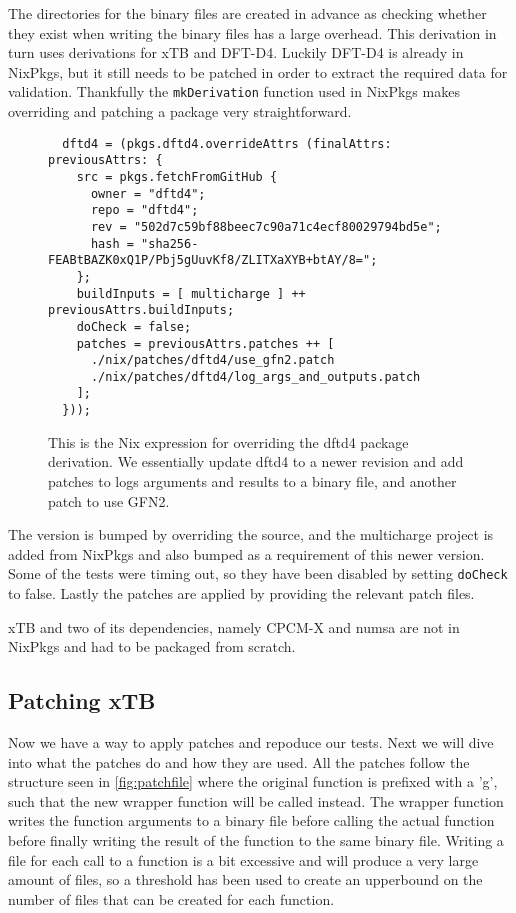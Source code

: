 The directories for the binary files are created in advance as checking whether they exist when writing the binary files has a large overhead.
This derivation in turn uses derivations for xTB and DFT-D4. Luckily DFT-D4 is already in NixPkgs, but it still needs to be patched in order to extract the required data for validation. Thankfully the \verb|mkDerivation| function used in NixPkgs makes overriding and patching a package very straightforward. 

\begin{figure}[H]
\begin{verbatim}
  dftd4 = (pkgs.dftd4.overrideAttrs (finalAttrs: previousAttrs: {
    src = pkgs.fetchFromGitHub {
      owner = "dftd4";
      repo = "dftd4";
      rev = "502d7c59bf88beec7c90a71c4ecf80029794bd5e";
      hash = "sha256-FEABtBAZK0xQ1P/Pbj5gUuvKf8/ZLITXaXYB+btAY/8=";
    };
    buildInputs = [ multicharge ] ++ previousAttrs.buildInputs;
    doCheck = false;
    patches = previousAttrs.patches ++ [
      ./nix/patches/dftd4/use_gfn2.patch
      ./nix/patches/dftd4/log_args_and_outputs.patch
    ];
  }));
\end{verbatim}
\caption{This is the Nix expression for overriding the dftd4 package derivation. We essentially update dftd4 to a newer revision and add patches to logs arguments and results to a binary file, and another patch to use GFN2.}
\label{fig:dftf4_drv}
\end{figure}

The version is bumped by overriding the source, and the multicharge project is added from NixPkgs and also bumped as a requirement of this newer version. Some of the tests were timing out, so they have been disabled by setting \verb|doCheck| to false. Lastly the patches are applied by providing the relevant patch files.

xTB and two of its dependencies, namely CPCM-X and numsa are not in NixPkgs and had to be packaged from scratch.

\subsection{Patching xTB}

Now we have a way to apply patches and repoduce our tests. Next we will dive into what the patches do and how they are used.
All the patches follow the structure seen in \autoref{fig:patchfile} where the original function is prefixed with a 'g', such that the new wrapper function will be called instead. The wrapper function writes the function arguments to a binary file before calling the actual function before finally writing the result of the function to the same binary file.
Writing a file for each call to a function is a bit excessive and will produce a very large amount of files, so a threshold has been used to create an upperbound on the number of files that can be created for each function.

